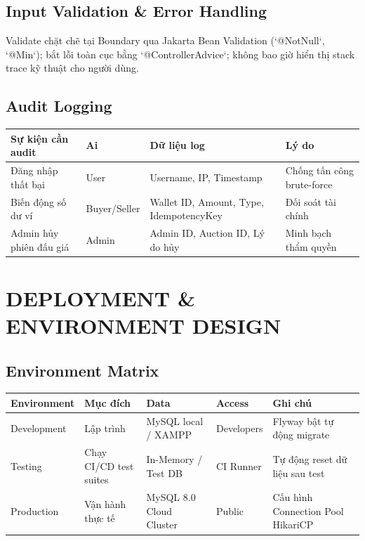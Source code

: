 \documentclass[11pt,a4paper]{article}
\begin{document}
\subsection{Input Validation \& Error Handling}
Validate chặt chẽ tại Boundary qua Jakarta Bean Validation (`@NotNull`, `@Min`); bắt lỗi toàn cục bằng `@ControllerAdvice`; không bao giờ hiển thị stack trace kỹ thuật cho người dùng.

\subsection{Audit Logging}
\begin{table}[H]
    \centering
    \small
    \begin{tabularx}{\textwidth}{|l|l|X|l|}
        \hline
        \textbf{Sự kiện cần audit} & \textbf{Ai} & \textbf{Dữ liệu log} & \textbf{Lý do} \\ \hline
        Đăng nhập thất bại & User & Username, IP, Timestamp & Chống tấn công brute-force \\ \hline
        Biến động số dư ví & Buyer/Seller & Wallet ID, Amount, Type, IdempotencyKey & Đối soát tài chính \\ \hline
        Admin hủy phiên đấu giá & Admin & Admin ID, Auction ID, Lý do hủy & Minh bạch thẩm quyền \\ \hline
    \end{tabularx}
\end{table}

\section{DEPLOYMENT \& ENVIRONMENT DESIGN}

\subsection{Environment Matrix}
\begin{table}[H]
    \centering
    \small
    \begin{tabularx}{\textwidth}{|l|l|l|l|X|}
        \hline
        \textbf{Environment} & \textbf{Mục đích} & \textbf{Data} & \textbf{Access} & \textbf{Ghi chú} \\ \hline
        Development & Lập trình & MySQL local / XAMPP & Developers & Flyway bật tự động migrate \\ \hline
        Testing & Chạy CI/CD test suites & In-Memory / Test DB & CI Runner & Tự động reset dữ liệu sau test \\ \hline
        Production & Vận hành thực tế & MySQL 8.0 Cloud Cluster & Public & Cấu hình Connection Pool HikariCP \\ \hline
    \end{tabularx}
\end{table}
\end{document}
